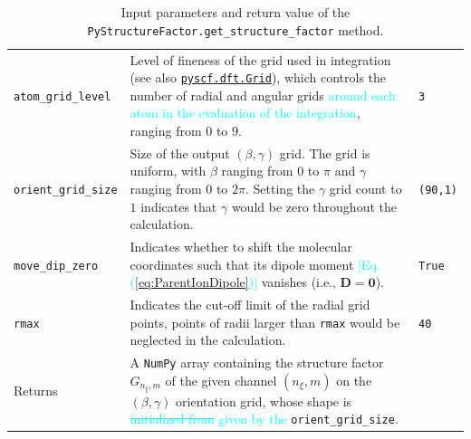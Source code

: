 \documentclass[preprint,12pt]{elsarticle} %
\newcommand{\bn}[1]{\mathbf{#1}}    %
\newcommand{\cyan}[1]{\textcolor{cyan}{#1}}     %
\newcommand{\cout}[1]{\textcolor{cyan}{\sout{#1}}}
\begin{document}
\begin{table}[tb]
\begin{tabular}{l p{9cm} l}
        \texttt{atom\_grid\_level}  & Level of fineness of the grid used in integration
                                      (see also \href{https://pyscf.org/pyscf_api_docs/pyscf.dft.html#module-pyscf.dft.gen_grid}{\texttt{pyscf.dft.Grid}}),
                                      which controls the number of radial and angular grids \cyan{around each atom in the evaluation of the integration},
                                      ranging from 0 to 9.
                                                                                                                                                & \texttt{3}        \\
        \texttt{orient\_grid\_size} & Size of the output $(\beta,\gamma)$ grid.
                                      The grid is uniform, with $\beta$ ranging from $0$ to $\pi$ and $\gamma$ ranging from $0$ to $2\pi$.
                                      Setting the $\gamma$ grid count to $1$ indicates that $\gamma$ would be zero throughout the calculation.
                                                                                                                                                & \texttt{(90,1)}   \\
        \texttt{move\_dip\_zero}    & Indicates whether to shift the molecular coordinates such that its dipole moment \cyan{[Eq. (\ref{eq:ParentIonDipole})]} vanishes
                                      (i.e., $\bn{D}=\bn{0}$).
                                                                                                                                                & \texttt{True}     \\
        \texttt{rmax}               & Indicates the cut-off limit of the radial grid points,
                                      points of radii larger than \texttt{rmax} would be neglected in the calculation.
                                                                                                                                                & \texttt{40}       \\
        \hline
        Returns                     & A \texttt{NumPy} array containing the structure factor $G_{n_\xi,m}$ of the given channel $(n_\xi,m)$
                                      on the $(\beta,\gamma)$ orientation grid, whose shape is \cout{initialized from} \cyan{given by the} \texttt{orient\_grid\_size}. \\
        \hline \hline
    \end{tabular}
    \caption{Input parameters and return value of the \texttt{PyStructureFactor.get\_structure\_factor} method.}
    \label{tab:getsf_param}
\end{table}
\end{document}
